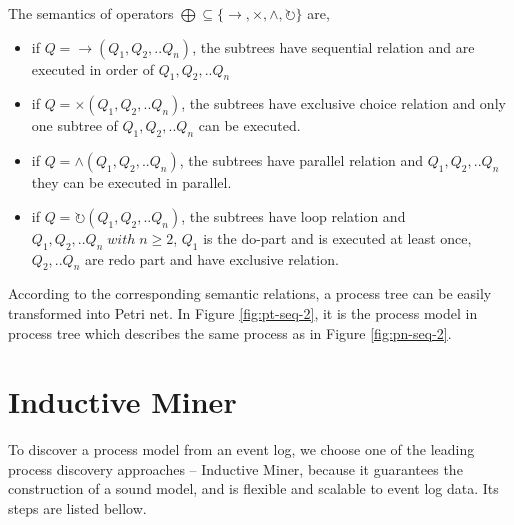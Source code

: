 \begin{definition} 
	The semantics of operators $\bigoplus \subseteq \{\rightarrow, \times, \land, \circlearrowright \}$ are,
	\begin{itemize}
		\item if $Q= \rightarrow(Q_1 , Q_2 ,.. Q_n)$, the subtrees have sequential relation and are executed in order of $Q_1,Q_2,..Q_n$
		\item if $Q= \times(Q_1 , Q_2 ,.. Q_n)$,  the subtrees have exclusive choice relation and only one subtree of $Q_1,Q_2,..Q_n$   can be executed.
		\item if $Q= \land (Q_1 , Q_2 ,.. Q_n)$,  the subtrees have parallel relation and $Q_1,Q_2,..Q_n$ they can be executed in parallel.
		\item if $Q= \circlearrowright(Q_1 , Q_2 ,.. Q_n)$,  the subtrees have loop relation and $Q_1,Q_2,..Q_n \; with\; n\geq2$, $Q_1$ is the do-part and is executed at least once, $Q_2,..Q_n$ are redo part and have exclusive relation.
	\end{itemize}
\end{definition}
According to the corresponding semantic relations,  a process tree can be easily transformed into Petri net. In Figure \ref{fig:pt-seq-2}, it is the process model in process tree which describes the same process as in Figure \ref{fig:pn-seq-2}. 
\section{Inductive Miner}
To discover a process model from an event log, we choose one of the leading process discovery approaches -- Inductive Miner, because it guarantees the construction of a sound model, and is flexible and scalable to event log data. Its steps are listed bellow. 
